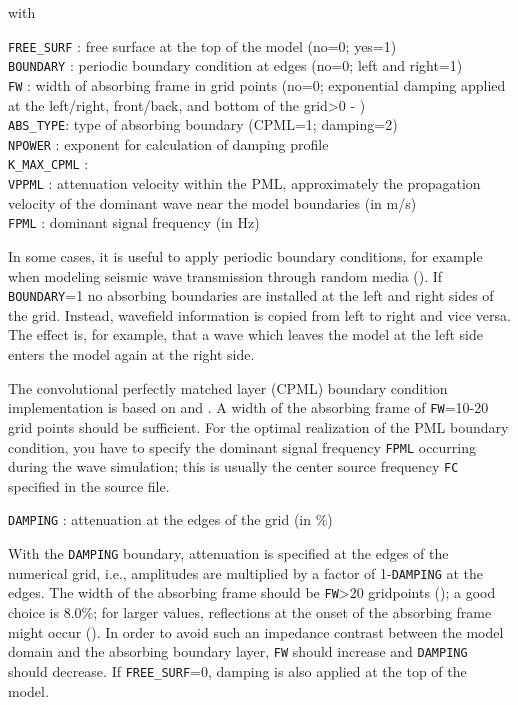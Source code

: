 with

\texttt{FREE\_SURF} : free surface at the top of the model (no=0; yes=1)\\
\texttt{BOUNDARY} : periodic boundary condition at edges (no=0; left and right=1)\\ 
\texttt{FW} : width of absorbing frame in grid points (no=0; exponential damping applied at the left/right, front/back, and bottom of the grid>0 - \cite{cerjan:85})\\
\texttt{ABS\_TYPE}: type of absorbing boundary (CPML=1; damping=2)\\
\texttt{NPOWER} : exponent for calculation of damping profile \\
\texttt{K\_MAX\_CPML} : \\
\texttt{VPPML} : attenuation velocity within the PML, approximately the propagation velocity of the dominant wave near the model boundaries (in m/s)\\
\texttt{FPML} : dominant signal frequency (in Hz)

In some cases, it is useful to apply periodic boundary conditions, for example when modeling seismic wave transmission through random media (\cite{bohlen:02}). If \texttt{BOUNDARY}=1 no absorbing boundaries are installed at the left and right sides of the grid. Instead, wavefield information is copied from left to right and vice versa. The effect is, for example, that a wave which leaves the model at the left side enters the model again at the right side.

The convolutional perfectly matched layer (CPML) boundary condition implementation is based on \citet{komatitsch:07} and \citet{martin:09}. A width of the absorbing frame of \texttt{FW}=10-20 grid points should be sufficient. For the optimal realization of the PML boundary condition, you have to specify the dominant signal frequency \texttt{FPML} occurring during the wave simulation; this is usually the center source frequency \texttt{FC} specified in the source file.

\texttt{DAMPING} : attenuation at the edges of the grid (in \%)

With the \texttt{DAMPING} boundary, attenuation is specified at the edges of the numerical grid, i.e., amplitudes are multiplied by a factor of 1-\texttt{DAMPING} at the edges. The width of the absorbing frame should be \texttt{FW}>20 gridpoints (\cite{cerjan:85}); a good choice is 8.0$\%$; for larger values, reflections at the onset of the absorbing frame might occur (\cite{cerjan:85}). In order to avoid such an impedance contrast between the model domain and the absorbing boundary layer, \texttt{FW} should increase and \texttt{DAMPING} should decrease. If \texttt{FREE\_SURF}=0, damping is also applied at the top of the model.

